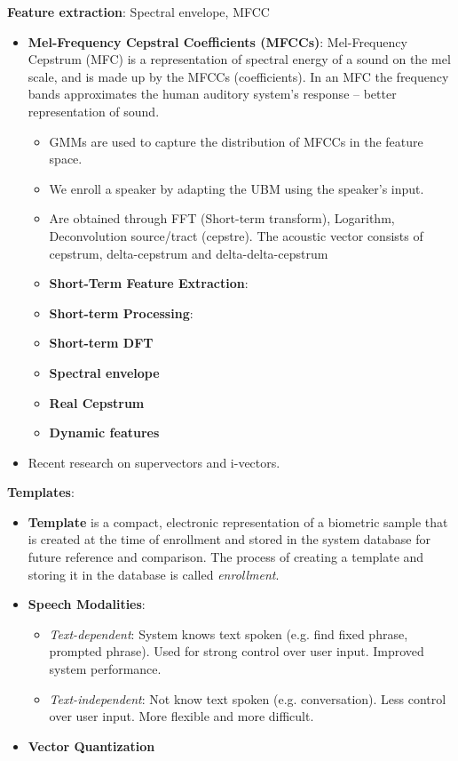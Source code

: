 \documentclass[a4paper]{article}
\begin{document}
      \textbf{Feature extraction}: Spectral envelope, MFCC 
      \begin{itemize}
        \item \textbf{Mel-Frequency Cepstral Coefficients (MFCCs)}: Mel-Frequency Cepstrum (MFC) is a representation of spectral energy of a sound on the mel scale, and is made up by the MFCCs (coefficients). In an MFC the frequency bands approximates the human auditory system's response -- better representation of sound.
        \begin{itemize}
          \item GMMs are used to capture the distribution of MFCCs in the feature space.
          \item We enroll a speaker by adapting the UBM using the speaker's input.
          \item Are obtained through FFT (Short-term transform), Logarithm, Deconvolution source/tract (cepstre). The acoustic vector consists of cepstrum, delta-cepstrum and delta-delta-cepstrum
          \item \textbf{Short-Term Feature Extraction}: 
          \item \textbf{Short-term Processing}: 
          \item \textbf{Short-term DFT} 
          \item \textbf{Spectral envelope} 
          \item \textbf{Real Cepstrum}
          \item \textbf{Dynamic features}
        \end{itemize}
        \item Recent research on supervectors and i-vectors.
      \end{itemize}

      \textbf{Templates}:
      \begin{itemize}
        \item \textbf{Template} is a compact, electronic representation of a biometric sample that is created at the time of enrollment and stored in the system database for future reference and comparison. The process of creating a template and storing it in the database is called \emph{enrollment}.
        \item \textbf{Speech Modalities}:
        \begin{itemize}
          \item \emph{Text-dependent}: System knows text spoken (e.g. find fixed phrase, prompted phrase). Used for strong control over user input. Improved system performance.
          \item \emph{Text-independent}: Not know text spoken (e.g. conversation). Less control over user input. More flexible and more difficult.
        \end{itemize}
        \item \textbf{Vector Quantization} 
      \end{itemize}
\end{document}
